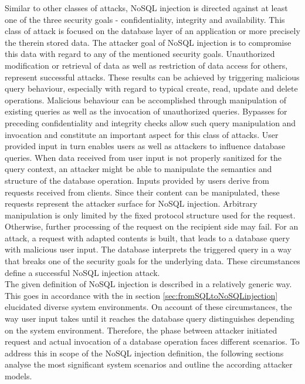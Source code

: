 Similar to other classes of attacks, NoSQL injection is directed against at least one of the three security goals - confidentiality, integrity and availability. This class of attack is focused on the database layer of an application or more precisely the therein stored data. The attacker goal of NoSQL injection is to compromise this data with regard to any of the mentioned security goals. Unauthorized modification or retrieval of data as well as restriction of data access for others, represent successful attacks. These results can be achieved by triggering malicious query behaviour, especially with regard to typical create, read, update and delete operations. Malicious behaviour can be accomplished through manipulation of existing queries as well as the invocation of unauthorized queries. Bypasses for preceding confidentiality and integrity checks allow such query manipulation and invocation and constitute an important aspect for this class of attacks. User provided input in turn enables users as well as attackers to influence database queries. When data received from user input is not properly sanitized for the query context, an attacker might be able to manipulate the semantics and structure of the database operation. Inputs provided by users derive from requests received from clients. Since their content can be manipulated, these requests represent the attacker surface for NoSQL injection. Arbitrary manipulation is only limited by the fixed protocol structure used for the request. Otherwise, further processing of the request on the recipient side may fail. For an attack, a request with adapted contents is built, that leads to a database query with malicious user input. The database interprets the triggered query in a way that breaks one of the security goals for the underlying data. These circumstances define a successful NoSQL injection attack.\\

The given definition of NoSQL injection is described in a relatively generic way. This goes in accordance with the in section \ref{sec:fromSQLtoNoSQLinjection} elucidated diverse system environments. On account of these circumstances, the way user input takes until it reaches the database query distinguishes depending on the system environment. Therefore, the phase between attacker initiated request and actual invocation of a database operation faces different scenarios. To address this in scope of the NoSQL injection definition, the following sections analyse the most significant system scenarios and outline the according attacker models.

